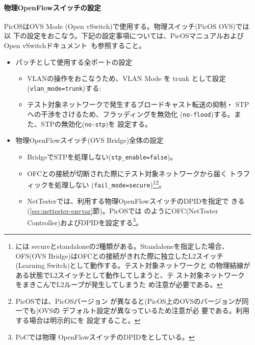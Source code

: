     \paragraph{物理OpenFlowスイッチの設定}
PicOSはOVS Mode (Open vSwitch)で使用する。物理スイッチ(PicOS OVS)では以
下の設定をおこなう。下記の設定事項については、PicOSマニュアルおよびOpen
vSwitchドキュメント~\cite{ovs-vswitchd-doc}も参照すること。
\begin{itemize}
 \item パッチとして使用する全ポートの設定~\cite{l1pjtech}
       \begin{itemize}
        \item VLANの操作をおこなうため、VLAN Mode を trunk として設定
              (\verb|vlan_mode=trunk|)する:
        \item テスト対象ネットワークで発生するブロードキャスト転送の抑制・
              STPへの干渉をさけるため、フラッディングを無効化
              (\verb|no-flood|)する。また、STPの無効化(\verb|no-stp|)を
              設定する。
       \end{itemize}
 \item 物理OpenFlowスイッチ(OVS Bridge)全体の設定
       \begin{itemize}
        \item BridgeでSTPを処理しない(\verb|stp_enable=false|)。
        \item OFCとの接続が切断された際にテスト対象ネットワークから届く
              トラフィックを処理しない
              (\verb|fail_mode=secure|)\footnote{には
              secureとstandaloneの2種類がある。Standaloneを指定した場合、
              OFS(OVS Bridge)はOFCとの接続がきれた際に独立したL2スイッチ
              (Learning Switch)として動作する。テスト対象ネットワークと
              の物理結線がある状態でL2スイッチとして動作してしまうと、テ
              スト対象ネットワークをまきこんでL2ループが発生してしまうた
              め注意が必要である。}\footnote{PicOSでは、PicOSバージョン
              が異なると(PicOS上のOVSのバージョンが同一でも)OVSの
              デフォルト設定が異なっているため注意が必
              要である。利用する場合は明示的にを
              設定すること。}。
        \item NetTesterでは、利用する物理OpenFlowスイッチのDPIDを指定で
              きる(\ref{sec:nettester-envvar}節)。PicOSでは
              のようにOFC(NetTester
              Controller)およびDPIDを設定する\footnote{PoCでは物理
              OpenFlowスイッチのDPIDをとしている。}。

\end{itemize}
\end{itemize}
